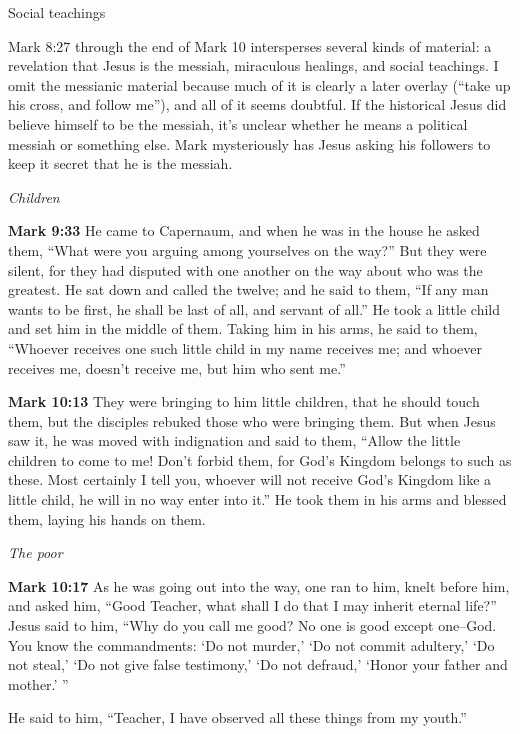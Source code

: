 \documentclass[10pt,twoside]{article} %
\newcommand{\quotesize}{\normalsize{}}
\newcommand{\comm}[1]{\begingroup \color{black!50} #1\endgroup}
\newenvironment{quotetext}{\begingroup\quotesize}{\endgroup}
\newcommand{\bible}[2]{\begin{quotetext}\textbf{#1} #2\end{quotetext}}
\newcommand{\gospelmark}[2]{\bible{Mark #1}{#2}}
\newcommand{\subhead}[1]{\emph{#1}\par}
\begin{document}
\begin{section}{Social teachings}

\comm{
Mark 8:27 through the end of Mark 10 intersperses several kinds of material: a revelation that Jesus is the messiah,
miraculous healings, and social teachings. I omit the messianic material because much of it is clearly a later overlay
(``take up his cross, and follow me''),
and all of it seems doubtful. If the historical Jesus did believe himself to be the messiah, it's unclear
whether he means a political messiah or something else.
Mark mysteriously has Jesus asking his followers to keep it secret that he is the messiah.
}

\subhead{Children}

\gospelmark{9:33}{
 He came to Capernaum, and when he was in the house he asked them, ``What were you arguing among yourselves on the way?''
  But they were silent, for they had disputed with one another on the way about who was the greatest.
  He sat down and called the twelve; and he said to them, ``If any man wants to be first, he shall be last of all, and servant of all.''   He took a little child and set him in the middle of them. Taking him in his arms, he said to them,    ``Whoever receives one such little child in my name receives me; and whoever receives me, doesn't receive me, but him who sent me.'' 
}

\gospelmark{10:13}{
They were bringing to him little children, that he should touch them, but the disciples rebuked those who were bringing them.   But when Jesus saw it, he was moved with indignation and said to them, ``Allow the little children to come to me! Don't forbid them, for God's Kingdom belongs to such as these.    Most certainly I tell you, whoever will not receive God's Kingdom like a little child, he will in no way enter into it.''   He took them in his arms and blessed them, laying his hands on them.
}

\subhead{The poor}

\gospelmark{10:17}{
As he was going out into the way, one ran to him, knelt before him, and asked him, ``Good Teacher, what shall I do that I may inherit eternal life?''
  Jesus said to him, ``Why do you call me good? No one is good except one--God.    You know the commandments: `Do not murder,' `Do not commit adultery,' `Do not steal,' `Do not give false testimony,' `Do not defraud,' `Honor your father and mother.' ''

  He said to him, ``Teacher, I have observed all these things from my youth.''

}
\end{section}
\end{document}
